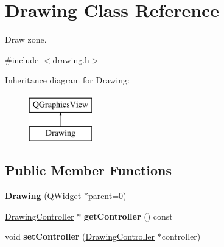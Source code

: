 \hypertarget{classDrawing}{}\section{Drawing Class Reference}
\label{classDrawing}


Draw zone.  




{\ttfamily \#include $<$drawing.\+h$>$}

Inheritance diagram for Drawing\+:\begin{figure}[H]
\begin{center}
\leavevmode
\includegraphics[height=2.000000cm]{classDrawing}
\end{center}
\end{figure}
\subsection*{Public Member Functions}
\begin{DoxyCompactItemize}
\item 
\hypertarget{classDrawing_a2eec835614b91275a21e0206ea846dbc}{}{\bfseries Drawing} (Q\+Widget $\ast$parent=0)\label{classDrawing_a2eec835614b91275a21e0206ea846dbc}

\item 
\hypertarget{classDrawing_aa14d3b246069dce9f2c4b6ab7a4e863a}{}\hyperlink{classDrawingController}{Drawing\+Controller} $\ast$ {\bfseries get\+Controller} () const \label{classDrawing_aa14d3b246069dce9f2c4b6ab7a4e863a}

\item 
\hypertarget{classDrawing_ade7da4991ba5da940cf92397d7d411e6}{}void {\bfseries set\+Controller} (\hyperlink{classDrawingController}{Drawing\+Controller} $\ast$controller)\label{classDrawing_ade7da4991ba5da940cf92397d7d411e6}

\end{DoxyCompactItemize}
